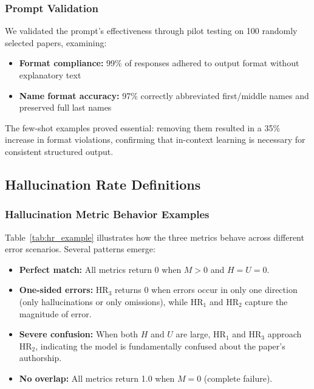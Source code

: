 \documentclass[11pt]{article}
\begin{document}
\subsubsection{Prompt Validation}

We validated the prompt's effectiveness through pilot testing on 100 randomly selected papers, examining:
\begin{itemize}[
   leftmargin=1em,
    itemsep=0.2em,
    topsep=0.2em,
    partopsep=0em,
    parsep=0em
]
\item \textbf{Format compliance:} 99\% of responses adhered to output format without explanatory text
\item \textbf{Name format accuracy:} 97\% correctly abbreviated first/middle names and preserved full last names
\end{itemize}

The few-shot examples proved essential: removing them resulted in a 35\% increase in format violations, confirming that in-context learning is necessary for consistent structured output.

\subsection{Hallucination Rate Definitions}
\label{sec:appendix_HR_definitions}

\subsubsection{Hallucination Metric Behavior Examples}

Table~\ref{tab:hr_example} illustrates how the three metrics behave across different error scenarios. Several patterns emerge:

\begin{itemize}[
   leftmargin=1em,
    itemsep=0.2em,
    topsep=0.2em,
    partopsep=0em,
    parsep=0em
]
\item \textbf{Perfect match:} All metrics return 0 when $M > 0$ and $H = U = 0$.
\item \textbf{One-sided errors:} HR$_3$ returns 0 when errors occur in only one direction (only hallucinations or only omissions), while HR$_1$ and HR$_2$ capture the magnitude of error.
\item \textbf{Severe confusion:} When both $H$ and $U$ are large, HR$_1$ and HR$_3$ approach HR$_2$, indicating the model is fundamentally confused about the paper's authorship.
\item \textbf{No overlap:} All metrics return 1.0 when $M = 0$ (complete failure).
\end{itemize}
\end{document}
